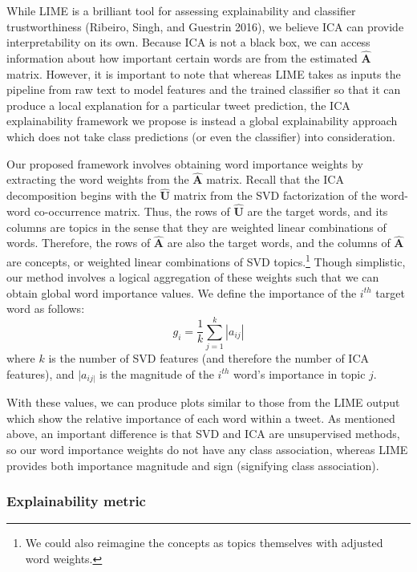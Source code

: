 \documentclass{article}
\begin{document}
While LIME is a brilliant tool for assessing explainability and
classifier trustworthiness (Ribeiro, Singh, and Guestrin 2016), we
believe ICA can provide interpretability on its own. Because ICA is not
a black box, we can access information about how important certain words
are from the estimated \(\mathbf{\hat{A}}\) matrix. However, it is
important to note that whereas LIME takes as inputs the pipeline from
raw text to model features and the trained classifier so that it can
produce a local explanation for a particular tweet prediction, the ICA
explainability framework we propose is instead a global explainability
approach which does not take class predictions (or even the classifier)
into consideration.

Our proposed framework involves obtaining word importance weights by
extracting the word weights from the \(\mathbf{\hat{A}}\) matrix. Recall
that the ICA decomposition begins with the \(\mathbf{\hat{U}}\) matrix
from the SVD factorization of the word-word co-occurrence matrix. Thus,
the rows of \(\mathbf{\hat{U}}\) are the target words, and its columns
are topics in the sense that they are weighted linear combinations of
words. Therefore, the rows of \(\mathbf{\hat{A}}\) are also the target
words, and the columns of \(\mathbf{\hat{A}}\) are concepts, or weighted
linear combinations of SVD topics.\footnote{We could also reimagine the
  concepts as topics themselves with adjusted word weights.} Though
simplistic, our method involves a logical aggregation of these weights
such that we can obtain global word importance values. We define the
importance of the \(i^{th}\) target word as follows:
\[g_i = \frac {1}{k} \sum_{j=1}^{k}{|a_{ij}|}\] where \(k\) is the
number of SVD features (and therefore the number of ICA features), and
\(|a_{ij|}\) is the magnitude of the \(i^{th}\) word's importance in
topic \(j\).

With these values, we can produce plots similar to those from the LIME
output which show the relative importance of each word within a tweet.
As mentioned above, an important difference is that SVD and ICA are
unsupervised methods, so our word importance weights do not have any
class association, whereas LIME provides both importance magnitude and
sign (signifying class association).

\hypertarget{explainability-metric}{%
\subsubsection{Explainability metric}\label{explainability-metric}}
\end{document}

